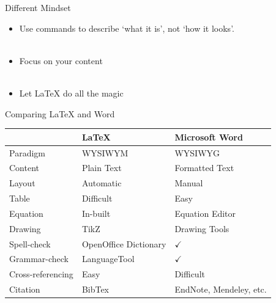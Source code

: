\documentclass[c]{beamer}
\begin{document}
\begin{frame}{Different Mindset}
  \begin{itemize}
    \item Use commands to describe `what it is', not `how it looks'.\\
    ~
    \item Focus on your content\\
    ~
    \item Let \LaTeX{} do all the magic
  \end{itemize}
\end{frame}

\begin{frame}{Comparing \LaTeX{} and Word}
\centering
\small
\begin{tabular}{l|p{3.5cm}| p{3.5cm}}
& \LaTeX & Microsoft Word \\ \hline \hline
Paradigm & WYSIWYM    & WYSIWYG \\ \hline
Content  & Plain Text & Formatted Text \\ \hline
Layout   & Automatic  & Manual \\ \hline
Table    & Difficult  & Easy \\ \hline
Equation & In-built   & Equation Editor \\ \hline
Drawing  & TikZ       & Drawing Tools \\ \hline
Spell-check & OpenOffice Dictionary & $\checkmark$ \\ \hline
Grammar-check & LanguageTool & $\checkmark$ \\ \hline
Cross-referencing & Easy & Difficult \\ \hline
Citation & BibTex & EndNote, Mendeley, etc.  \\
\end{tabular}
\end{frame}
\end{document}
